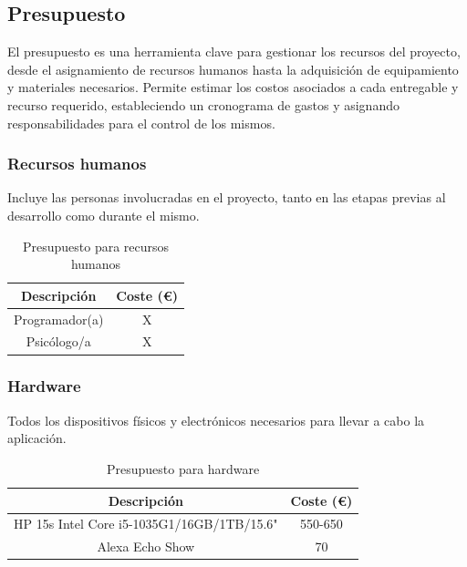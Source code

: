 \subsection{Presupuesto}

El presupuesto es una herramienta clave para gestionar los recursos del proyecto, desde el asignamiento de recursos humanos hasta la adquisición de equipamiento y materiales necesarios. Permite estimar los costos asociados a cada entregable y recurso requerido, estableciendo un cronograma de gastos y asignando responsabilidades para el control de los mismos.

\subsubsection{Recursos humanos}
Incluye las personas involucradas en el proyecto, tanto en las etapas previas al desarrollo como durante el mismo.

\begin{table}[H]
    \centering
    \begin{tabular}{|c|c|}
    \hline
    \rowcolor{lightgray}
    \textbf{Descripción} & \textbf{Coste (€)}\\
    \hline
    Programador(a) & X \\
    \hline
    Psicólogo/a & X \\
    \hline
    \end{tabular}
    \caption{Presupuesto para recursos humanos}
    \label{tab:presupuesto-personal}
\end{table}

\subsubsection{Hardware}
Todos los dispositivos físicos y electrónicos necesarios para llevar a cabo la aplicación.

\begin{table}[H]
    \centering
    \begin{tabular}{|c|c|}
    \hline
    \rowcolor{lightgray}
    \textbf{Descripción} & \textbf{Coste (€)}\\
    \hline
    HP 15s Intel Core i5-1035G1/16GB/1TB/15.6" & 550-650 \\
    \hline
    Alexa Echo Show & 70 \\
    \hline
    \end{tabular}
    \caption{Presupuesto para hardware}
    \label{tab:presupuesto-hw}
\end{table}

